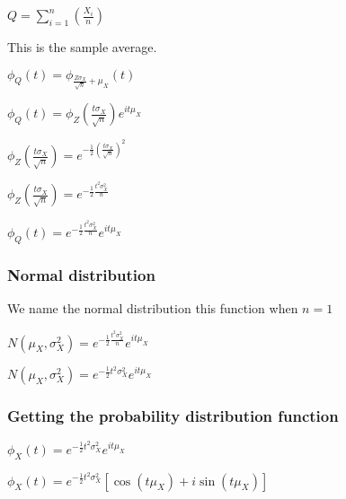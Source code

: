 $Q=\sum_{i=1}^n(\frac{X_i}{n})$

This is the sample average.

$\phi_Q(t)=\phi_{\frac{Z\sigma_X }{\sqrt n}+\mu_X}(t)$

$\phi_Q(t)=\phi_Z(\frac{t\sigma_X }{\sqrt n})e^{it\mu_X}$

$\phi_Z(\frac{t\sigma_X }{\sqrt n})=e^{-\frac{1}{2}(\frac{t\sigma_X }{\sqrt n})^2}$

$\phi_Z(\frac{t\sigma_X }{\sqrt n})=e^{-\frac{1}{2}\frac{t^2\sigma^2_X }{n}}$

$\phi_Q(t)=e^{-\frac{1}{2}\frac{t^2\sigma^2_X }{n}}e^{it\mu_X}$

\subsubsection{Normal distribution}

We name the normal distribution this function when \(n=1\)

$N(\mu_X, \sigma^2_X)=e^{-\frac{1}{2}\frac{t^2\sigma^2_X }{n}}e^{it\mu_X}$

$N(\mu_X, \sigma^2_X)=e^{-\frac{1}{2}t^2\sigma^2_X }e^{it\mu_X}$

\subsubsection{Getting the probability distribution function}

$\phi_X(t)=e^{-\frac{1}{2}t^2\sigma^2_X} e^{it\mu_X}$

$\phi_X(t)=e^{-\frac{1}{2}t^2\sigma^2_X}[\cos (t\mu_X )+i\sin (t\mu_X)]$

